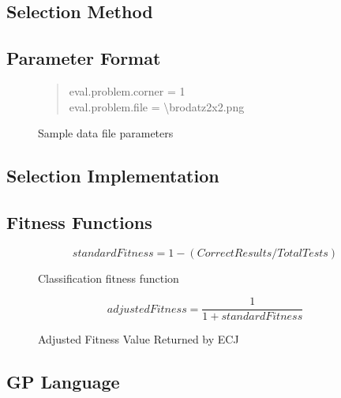 \documentclass[titlepage,letterpaper]{article}
\begin{document}
\subsection{Selection Method}
\label{sec:Selection}


\subsection{Parameter Format}
\label{sec:Format}


\begin{figure}[H]
\centering
\begin{quote}
eval.problem.corner = 1\\
eval.problem.file  = \textbackslash brodatz2x2.png
\end{quote}
\caption{\label{fig:sampleDataParams}Sample data file parameters}
\end{figure}

\subsection{Selection Implementation}
\label{sec:Implementation}


\subsection{Fitness Functions}
\label{sec:Fitness}


\begin{figure}[H]
\[ standardFitness = 1 - (CorrectResults / TotalTests) \]
\caption{Classification fitness function} 
\label{fig:fitnessFunction}
\end{figure}

\begin{figure}[H]
\[ adjustedFitness = \frac{1}{1 + standardFitness} \]
\caption{Adjusted Fitness Value Returned by ECJ} 
\label{fig:adjustedfitness}
\end{figure}

\subsection{GP Language}
\label{sec:Language}
\end{document}
